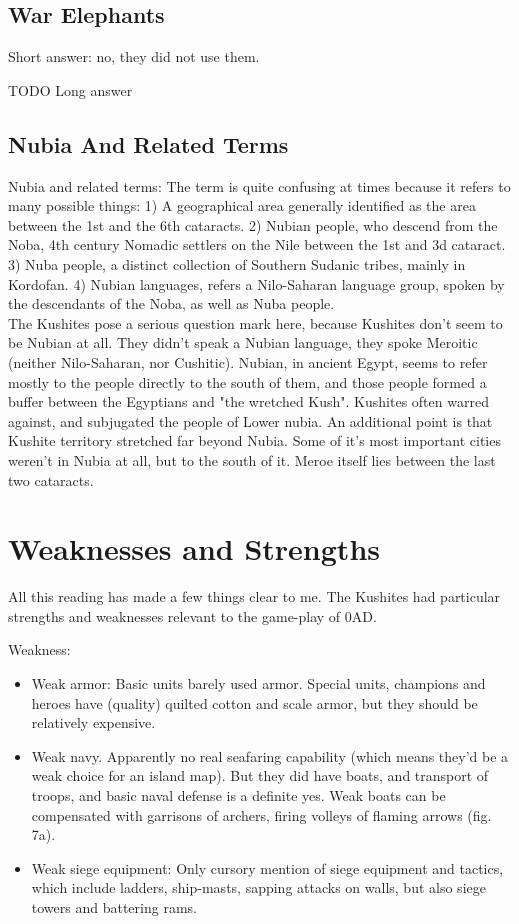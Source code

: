 \documentclass[a4paper,12pt]{scrreprt}
\begin{document}
\subsection{War Elephants}

Short answer: no, they did not use them.

TODO Long answer

\subsection{Nubia And Related Terms}

Nubia and related terms: The term is quite confusing at times because it refers to many possible things: 1) A geographical area generally identified as the area between the 1st and the 6th cataracts. 2) Nubian people, who descend from the Noba, 4th century Nomadic settlers on the Nile between the 1st and 3d cataract. 3) Nuba people, a distinct collection of Southern Sudanic tribes, mainly in Kordofan. 4) Nubian languages, refers a Nilo-Saharan language group, spoken by the descendants of the Noba, as well as Nuba people.\\  

The Kushites pose a serious question mark here, because Kushites don't seem to be Nubian at all. They didn't speak a Nubian language, they spoke Meroitic (neither Nilo-Saharan, nor Cushitic). Nubian, in ancient Egypt, seems to refer mostly to the people directly to the south of them, and those people formed a buffer between the Egyptians and "the wretched Kush". Kushites often warred against, and subjugated the people of Lower nubia. An additional point is that Kushite territory stretched far beyond Nubia. Some of it's most important cities weren't in Nubia at all, but to the south of it. Meroe itself lies between the last two cataracts. 

\section{Weaknesses and Strengths}

All this reading has made a few things clear to me. The Kushites had particular strengths and weaknesses relevant to the game-play of 0AD.

Weakness:

\begin{itemize}
	\item Weak armor: Basic units barely used armor. Special units, champions and heroes have (quality) quilted cotton and scale armor, but they should be relatively expensive.
	\item Weak navy. Apparently no real seafaring capability (which means they’d be a weak choice for an island map). But they did have boats, and transport of troops, and basic naval defense is a definite yes. Weak boats can be compensated with garrisons of archers, firing volleys of flaming arrows (fig. 7a).
	\item Weak siege equipment: Only cursory mention of siege equipment and tactics, which include ladders, ship-masts, sapping attacks on walls, but also siege towers and battering rams.
\end{itemize}
\end{document}
